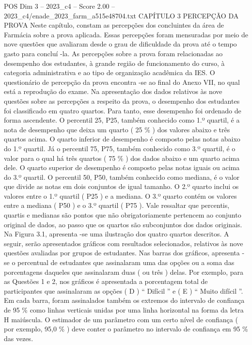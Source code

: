 \begin{textsample}{POS Dim 3 – 2023\_c4 – Score 2.00 – 2023\_c4/enade\_2023\_farm\_a515e48704.txt}  \label{ex:f3_pos_097}
CAPÍTULO 3 PERCEPÇÃO DA PROVA Neste capítulo, constam as percepções dos concluintes da área de Farmácia sobre a prova aplicada.
Essas percepções foram mensuradas por meio de nove questões que avaliaram desde o grau de dificuldade da prova até o tempo gasto para concluí -la.
As percepções sobre a prova foram relacionadas ao desempenho dos estudantes, à grande região de funcionamento do curso, à categoria administrativa e ao tipo de organização acadêmica da IES.
O questionário de percepção da prova encontra -se ao final do Anexo VII, no qual está a reprodução do exame.
Na apresentação dos dados relativos às nove questões sobre as percepções a respeito da prova, o desempenho dos estudantes foi classificado em quatro quartos.
Para tanto, esse desempenho foi ordenado de forma ascendente.
O percentil 25, P25, também conhecido como 1.º quartil, é a nota de desempenho que deixa um quarto ( 25 \% ) dos valores abaixo e três quartos acima.
O quarto inferior de desempenho é composto pelas notas abaixo do 1.º quartil.
Já o percentil 75, P75, também conhecido como 3.º quartil, é o valor para o qual há três quartos ( 75 \% ) dos dados abaixo e um quarto acima dele.
O quarto superior de desempenho é composto pelas notas iguais ou acima do 3.º quartil.
O percentil 50, P50, também conhecido como mediana, é o valor que divide as notas em dois conjuntos de igual tamanho.
O 2.º quarto inclui os valores entre o 1.º quartil ( P25 ) e a mediana.
O 3.º quarto contém os valores entre a mediana ( P50 ) e o 3.º quartil ( P75 ).
Vale ressaltar que percentis, quartis e medianas são pontos que não obrigatoriamente pertencem ao conjunto original de dados, ao passo que os quartos são subconjuntos dos dados originais.
Na Figura 3.1, apresenta -se uma ilustração dos quatro quartos descritos.
A seguir, serão apresentados gráficos com resultados selecionados, relativos às nove questões avaliadas por grupos de estudantes.
Nas barras dos gráficos, apresenta -se o percentual de estudantes que assinalaram uma das opções ou a soma das porcentagens daqueles que assinalaram duas ( ou três ) delas.
Por exemplo, para as Questões 1 e 2, nos gráficos é apresentada a porcentagem total de participantes que assinalaram as opções ( D ) “ Difícil ” e ( E ) “ Muito difícil ”.
Em cada barra, foram assinalados também os extremos do intervalo de confiança de 95 \% como linhas verticais unidas por uma linha horizontal na forma da letra H maiúscula.
O estimador de um parâmetro com um certo nível de confiança ( por exemplo, 95,0 \% ) deve conter o parâmetro no intervalo de confiança em 95 \% das vezes.

\end{textsample}

